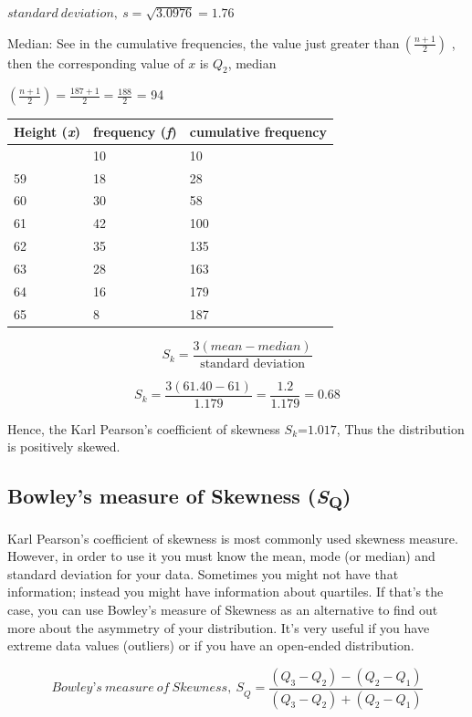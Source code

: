 \documentclass[
]{book}
\begin{document}
\(standard\ deviation,\ s = \sqrt{3.0976} = 1.76\)

Median: See in the cumulative frequencies, the value just greater than\(\ \left( \frac{n + 1}{2} \right)\) , then the corresponding value of \(x\) is \(Q_{2}\), median

\(\left( \frac{n + 1}{2} \right) = \frac{187 + 1}{2}= \frac{188}{2}\) = 94

\begin{longtable}[]{@{}lll@{}}
\toprule\noalign{}
Height (\emph{x}) & frequency (\emph{f}) & cumulative frequency \\
\midrule\noalign{}
\endhead
\bottomrule\noalign{}
\endlastfoot
58 & 10 & 10 \\
59 & 18 & 28 \\
60 & 30 & 58 \\
61 & 42 & 100 \\
62 & 35 & 135 \\
63 & 28 & 163 \\
64 & 16 & 179 \\
65 & 8 & 187 \\
\end{longtable}

\[S_{k} = \frac{3(mean - median)}{\text{standard deviation}}\]

\[S_{k} = \frac{3(61.40 - 61)}{1.179} = \frac{1.2}{1.179} = 0.68\]

Hence, the Karl Pearson's coefficient of skewness \(S_{k}\)=\(1.017\), Thus the distribution is positively skewed.

\subsection{\texorpdfstring{Bowley's measure of Skewness (\emph{S}\textsubscript{Q})}{Bowley's measure of Skewness (SQ)}}\label{bowleys-measure-of-skewness-sq}

Karl Pearson's coefficient of skewness is most commonly used skewness measure. However, in order to use it you must know the mean, mode (or median) and standard deviation for your data. Sometimes you might not have that information; instead you might have information about quartiles. If that's the case, you can use Bowley's measure of Skewness as an alternative to find out more about the asymmetry of your distribution. It's very useful if you have extreme data values (outliers) or if you have an open-ended distribution.

\[{Bowley’s\ measure\ of\ Skewness,\ S}_{Q} = \frac{\left( Q_{3} - Q_{2} \right) - \left( Q_{2} - Q_{1} \right)}{\left( Q_{3} - Q_{2} \right) + \left( Q_{2} - Q_{1} \right)}\]
\end{document}
